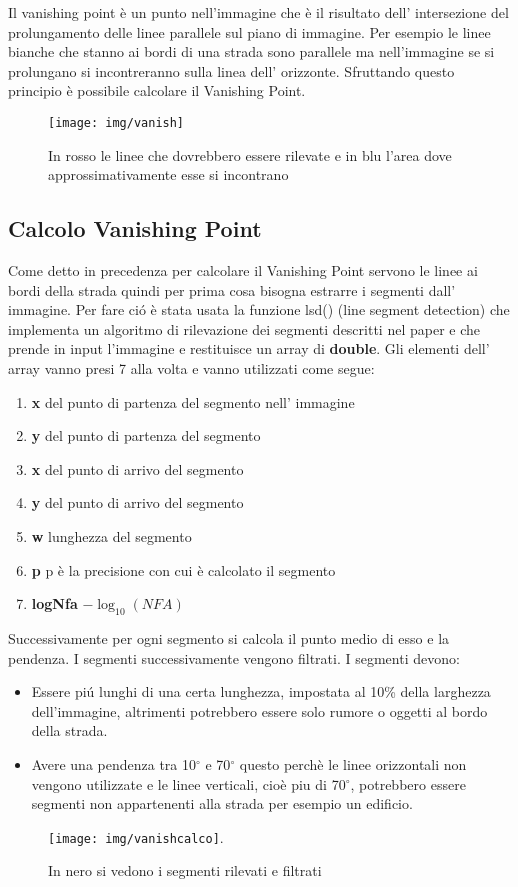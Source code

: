 		Il vanishing point è un punto nell'immagine che è il risultato  dell' intersezione del prolungamento delle linee parallele sul piano di immagine. Per esempio le linee bianche che stanno ai bordi di una strada sono parallele ma nell'immagine se si prolungano si incontreranno sulla linea dell' orizzonte. Sfruttando questo principio è possibile calcolare il Vanishing Point.
		\begin{figure}[!ht]
			\centering
			\texttt{[image: img/vanish]}
			\caption[Punto sull'orizzonte]{In rosso le linee che dovrebbero essere rilevate e in blu l'area dove approssimativamente esse si incontrano}
		\end{figure}

	\subsection{Calcolo Vanishing Point}
		Come detto in precedenza per calcolare il Vanishing Point servono le linee ai bordi della strada quindi per prima cosa bisogna estrarre i segmenti dall' immagine. Per fare ci\'o è stata usata la funzione lsd() (line segment detection) che implementa un algoritmo di rilevazione dei segmenti descritti nel paper \cite{lsd} e che prende in input l'immagine e restituisce un array di \textbf{double}.
		Gli elementi dell' array vanno presi 7 alla volta e vanno utilizzati come segue:
		\begin{enumerate}
			\item \textbf{x} del punto di partenza del segmento nell' immagine
			\item \textbf{y} del punto di partenza del segmento
			\item \textbf{x} del punto di arrivo del segmento
			\item \textbf{y} del punto di arrivo del segmento
			\item \textbf{w} lunghezza del segmento
			\item \textbf{p} p è la precisione con cui è calcolato il segmento
			\item \textbf{logNfa} $ - \log_{10}(NFA)$
		\end{enumerate}
		Successivamente per ogni segmento si calcola il punto medio di esso e la pendenza. I segmenti successivamente vengono filtrati.
		I segmenti devono:
		\begin{itemize}
			\item Essere pi\'u lunghi di una certa lunghezza, impostata al 10\% della larghezza dell'immagine, altrimenti potrebbero essere solo rumore o oggetti al bordo della strada.
			\item Avere una pendenza tra 10$^{\circ}$ e 70$^{\circ}$ questo perchè le linee orizzontali non vengono utilizzate e le linee verticali, cioè piu di 70$^{\circ}$, potrebbero essere segmenti non appartenenti alla strada per esempio un edificio.
		\end{itemize}
		\begin{figure}[!ht]
			\centering
			\texttt{[image: img/vanishcalco]}.
			\caption[Segmenti rilevati]{In nero si vedono i segmenti rilevati e filtrati}
		\end{figure}

